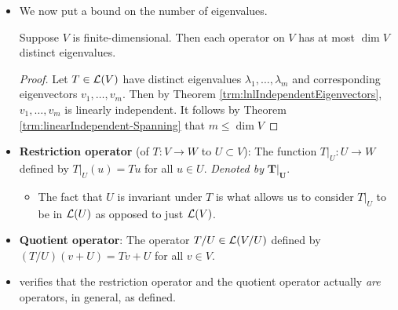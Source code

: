 \documentclass[../main.tex]{subfiles}
\begin{document}
\begin{itemize}
\begin{theorem}
\begin{proof}
\begin{align*}
                v_k &= a_1v_1+\cdots+a_{k-1}v_{k-1}\\
                &= 0
            \end{align*}
            contradicting the fact that $v_k$, as an eigenvector, is nonzero.
        \end{proof}
    \end{theorem}
    \item We now put a bound on the number of eigenvalues.
    \begin{theorem}
        Suppose $V$ is finite-dimensional. Then each operator on $V$ has at most $\dim V$ distinct eigenvalues.
        \begin{proof}
            Let $T\in\mathcal{L}(V)$ have distinct eigenvalues $\lambda_1,\dots,\lambda_m$ and corresponding eigenvectors $v_1,\dots,v_m$. Then by Theorem \ref{trm:lnlIndependentEigenvectors}, $v_1,\dots,v_m$ is linearly independent. It follows by Theorem \ref{trm:linearIndependent-Spanning} that $m\leq\dim V$
        \end{proof}
    \end{theorem}
    \item \textbf{Restriction operator} (of $T:V\to W$ to $U\subset V$): The function $T|_U:U\to W$ defined by $T|_U(u)=Tu$ for all $u\in U$. \emph{Denoted by} $\bm{T|_U}$.
    \begin{itemize}
        \item The fact that $U$ is invariant under $T$ is what allows us to consider $T|_U$ to be in $\mathcal{L}(U)$ as opposed to just $\mathcal{L}(V)$.
    \end{itemize}
    \item \textbf{Quotient operator}: The operator $T/U\in\mathcal{L}(V/U)$ defined by $(T/U)(v+U)=Tv+U$ for all $v\in V$.
    \item \textcite{bib:Axler} verifies that the restriction operator and the quotient operator actually \emph{are} operators, in general, as defined.
\end{itemize}
\end{document}
